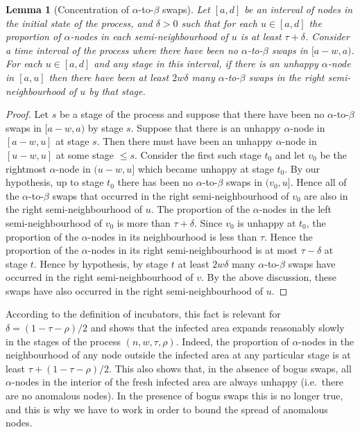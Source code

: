 \documentclass[11pt]{article}
\theoremstyle{plain}
\newtheorem{lem}[thm]{Lemma}
\numberwithin{equation}{subsection}
\begin{document}
\begin{lem}[Concentration of $\alpha$-to-$\beta$ swaps]\label{le:deephl}
Let $[a,d]$ be an interval of nodes in the initial state of the process,
and $\delta>0$ 
such that for each $u\in [a,d]$ the proportion of $\alpha$-nodes in  
each semi-neighbourhood of $u$ is at least $\tau+\delta$. 
Consider a time interval of the 
process where there have been no 
$\alpha$-to-$\beta$ swaps in
$[a-w, a)$. 
For each $u\in [a,d]$ and any stage in this interval,
if there is an unhappy $\alpha$-node in $[a, u]$  then there have been at least 
$2w\delta$ many $\alpha$-to-$\beta$ swaps 
in the right semi-neighbourhood of $u$ by that stage.
\end{lem}
\begin{proof}
Let $s$ be a stage of the process and suppose that
there have been no $\alpha$-to-$\beta$ swaps in $[a-w, a)$ by stage $s$.
Suppose that there is an unhappy $\alpha$-node in $[a-w, u]$ at stage $s$.
Then there must have been an unhappy
$\alpha$-node in $[u-w, u]$ at some stage $\leq s$. 
Consider the first such stage $t_0$ and let $v_0$ be the rightmost
$\alpha$-node in $(u-w, u]$ which became unhappy at stage $t_0$.
By our hypothesis, up to stage $t_0$ there has been no 
$\alpha$-to-$\beta$ swaps in
$(v_0,u]$. Hence all of the $\alpha$-to-$\beta$ swaps 
that occurred in the right semi-neighbourhood of $v_0$ are also in the
right semi-neighbourhood of $u$.
The proportion of the $\alpha$-nodes in the left 
semi-neighbourhood of $v_0$ is more than $\tau+\delta$.
Since $v_0$ is unhappy at $t_0$, the proportion 
of the $\alpha$-nodes in its neighbourhood is less than $\tau$. Hence
the proportion of the $\alpha$-nodes in 
its right semi-neighbourhood is at most $\tau-\delta$
at stage $t$. Hence by hypothesis, by stage $t$ at least 
$2w\delta$ many $\alpha$-to-$\beta$ swaps have occurred in the 
right semi-neighbourhood of $v$. By the above discussion,
these swaps have also occurred in the 
right semi-neighbourhood of $u$.
\end{proof}

According to the definition of incubators, this fact is relevant 
for $\delta=(1-\tau-\rho)/2$ and shows that the infected area expands reasonably slowly
in the stages of the  process $(n,w,\tau,\rho)$.
Indeed, the proportion of $\alpha$-nodes in
the neighbourhood of any node outside the infected area
at any particular stage is at least $\tau+(1-\tau-\rho)/2$.
This also shows that, in the absence of bogus swaps, all $\alpha$-nodes in the
interior of the fresh infected area are always unhappy (i.e.\ there are no anomalous nodes).
In the presence of bogus swaps this is no longer true, and this is why we have to work
in order to bound the spread of anomalous nodes. 
\end{document}
